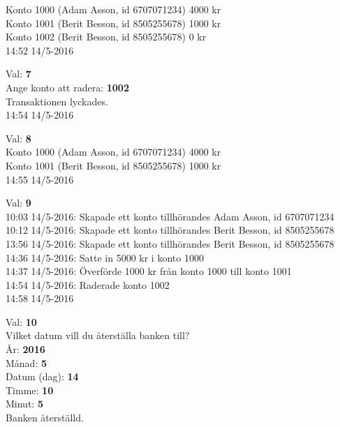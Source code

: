 \begin{multicols}{2}
\begin{exampleblock}
Konto 1000 (Adam Asson, id 6707071234) 4000 kr\\
Konto 1001 (Berit Besson, id 8505255678) 1000 kr\\
Konto 1002 (Berit Besson, id 8505255678) 0 kr\\
14:52 14/5-2016\\
\end{exampleblock}
\begin{exampleblock}
Val: \textbf{7}\\
Ange konto att radera: \textbf{1002}\\
Transaktionen lyckades.\\
14:54 14/5-2016\\
\end{exampleblock}
\begin{exampleblock}
Val: \textbf{8}\\
Konto 1000 (Adam Asson, id 6707071234) 4000 kr\\
Konto 1001 (Berit Besson, id 8505255678) 1000 kr\\
14:55 14/5-2016\\
\end{exampleblock}
\begin{exampleblock}
Val: \textbf{9}\\
10:03 14/5-2016: Skapade ett konto tillhörandes Adam Asson, id 6707071234\\
10:12 14/5-2016: Skapade ett konto tillhörandes Berit Besson, id 8505255678\\
13:56 14/5-2016: Skapade ett konto tillhörandes Berit Besson, id 8505255678\\
14:36 14/5-2016: Satte in 5000 kr i konto 1000\\
14:37 14/5-2016: Överförde 1000 kr från konto 1000 till konto 1001\\
14:54 14/5-2016: Raderade konto 1002\\
14:58 14/5-2016\\
\end{exampleblock}
\begin{exampleblock}
Val: \textbf{10}\\
Vilket datum vill du återställa banken till?\\
År: \textbf{2016}\\
Månad: \textbf{5}\\
Datum (dag): \textbf{14}\\
Timme: \textbf{10}\\
Minut: \textbf{5}\\
Banken återställd.\\

\end{exampleblock}
\end{multicols}
